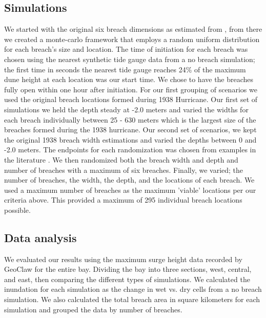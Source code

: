 \documentclass{coastal_paper}
\begin{document}
\subsection*{Simulations}
We started with the original six breach dimensions as estimated from \citet{Canizares2008}, from there we created a monte-carlo framework that employs a random uniform distribution for each breach's size and location. The time of initiation for each breach was chosen using the nearest synthetic tide gauge data from a no breach simulation; the first time in seconds the nearest tide gauge reaches 24\% of the maximum dune height at each location was our start time. We chose to have the breaches fully open within one hour after initiation.
For our first grouping of scenarios we used the original breach locations formed during 1938 Hurricane. Our first set of simulations we held the depth steady at -2.0 meters and varied the widths for each breach individually between 25 - 630 meters which is the largest size of the breaches formed during the 1938 hurricane. Our second set of scenarios, we kept the original 1938 breach width estimations and varied the depths between 0 and -2.0 meters. The endpoints for each randomization was chosen from examples in the literature \citep{Schmeltz1983Breach/InletInlet., Kraus2003a,Visser1999, Canizares2008}. We then randomized both the breach width and depth and number of breaches with a maximum of six breaches. 
Finally, we varied; the number of breaches, the width, the depth, and the locations of each breach. We used a maximum number of breaches as the maximum 'viable' locations per our criteria above. This provided a maximum of 295 individual breach locations possible.
\subsection{Data analysis}
We evaluated our results using the maximum surge height data recorded by GeoClaw for the entire bay. Dividing the bay into three sections, west, central, and east, then comparing the different types of simulations. We calculated the inundation for each simulation as the change in wet vs. dry cells from a no breach simulation. We also calculated the total breach area in square kilometers for each simulation and grouped the data by number of breaches.
\end{document}
